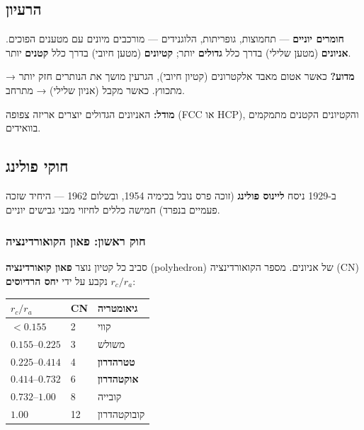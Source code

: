 \documentclass[
  hebrew,
  letterpaper,
  DIV=11,
  numbers=noendperiod]{scrreprt}
\newcounter{none} %
\begin{document}
\subsection{הרעיון}\label{ux5d4ux5e8ux5e2ux5d9ux5d5ux5df-2}

\textbf{חומרים יוניים} --- תחמוצות, גופריתות, הלוגנידים --- מורכבים
מיונים עם מטענים הפוכים. \textbf{אניונים} (מטען שלילי) בדרך כלל
\textbf{גדולים} יותר; \textbf{קטיונים} (מטען חיובי) בדרך כלל
\textbf{קטנים} יותר.

\textbf{מדוע?} כאשר אטום מאבד אלקטרונים (קטיון חיובי), הגרעין מושך את
הנותרים חזק יותר → מתכווץ. כאשר מקבל (אניון שלילי) → מתרחב.

\textbf{מודל:} האניונים הגדולים יוצרים אריזה צפופה (FCC או HCP),
והקטיונים הקטנים מתמקמים בוואידים.

\subsection{חוקי
פולינג}\label{ux5d7ux5d5ux5e7ux5d9-ux5e4ux5d5ux5dcux5d9ux5e0ux5d2}

ב-1929 ניסח \textbf{ליינוס פולינג} (זוכה פרס נובל בכימיה 1954, ובשלום
1962 --- היחיד שזכה פעמיים בנפרד) חמישה כללים לחיזוי מבני גבישים יוניים.

\subsubsection{חוק ראשון: פאון
הקואורדינציה}\label{ux5d7ux5d5ux5e7-ux5e8ux5d0ux5e9ux5d5ux5df-ux5e4ux5d0ux5d5ux5df-ux5d4ux5e7ux5d5ux5d0ux5d5ux5e8ux5d3ux5d9ux5e0ux5e6ux5d9ux5d4}

סביב כל קטיון נוצר \textbf{פאון קואורדינציה} (polyhedron) של אניונים.
מספר הקואורדינציה (CN) נקבע על ידי \textbf{יחס הרדיוסים} \(r_c/r_a\):

{\def\LTcaptype{none} %
\begin{longtable}[]{@{}lll@{}}
\toprule\noalign{}
\(r_c/r_a\) & CN & גיאומטריה \\
\midrule\noalign{}
\endhead
\bottomrule\noalign{}
\endlastfoot
\(< 0.155\) & 2 & קווי \\
\(0.155\)--\(0.225\) & 3 & משולש \\
\(0.225\)--\(0.414\) & 4 & \textbf{טטרהדרון} \\
\(0.414\)--\(0.732\) & 6 & \textbf{אוקטהדרון} \\
\(0.732\)--\(1.00\) & 8 & קובייה \\
\(1.00\) & 12 & קובוקטהדרון \\
\end{longtable}
}
\end{document}
